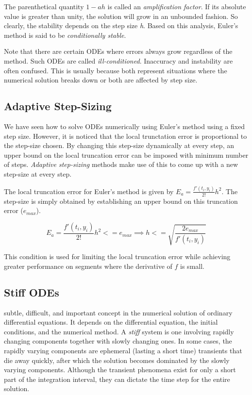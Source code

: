 \documentclass[book.tex]{subfiles}
\begin{document}
The parenthetical quantity $1-ah$ is called an \textit{amplification factor}. If its absolute value is greater than unity, the solution will grow in an unbounded fashion. So clearly, the stability depends on the step size \textit{h}. Based on this analysis,
Euler’s method is said to be \textit{conditionally stable}.

Note that there are certain ODEs where errors always grow regardless of the method.
Such ODEs are called \textit{ill-conditioned}. Inaccuracy and instability are often confused. This is usually because both represent situations where the numerical solution breaks down or both are affected by step size.

\subsection{Adaptive Step-Sizing}

We have seen how to solve ODEs numerically using Euler's method using
 a fixed step size. However, it is noticed that the local trunctation error is proportional to the step-size chosen. By changing this step-size dynamically at every step, an upper bound on the local truncation error can be imposed with minimum number of steps. \textit{Adaptive step-sizing} methods make use of this to come up with a new step-size at every step.

The local truncation error for Euler's method is given by $E_a = \frac{f'(t_i,y_i)}{2!}h^2$. The step-size is simply obtained by establishing an upper bound on this truncation error ($e_{max}$).

	\begin{equation*}
	E_a = \frac{f'(t_i,y_i)}{2!}h^2 <= e_{max} \implies h <= \sqrt{\dfrac{2e_{max}}{f'(t_i,y_i)}}
	\end{equation*}
	
This condition is used for limiting the local truncation error while achieving greater performance on segments where the derivative of $f$ is small. 

\subsection{Stiff ODEs}

subtle, difficult, and important concept in the numerical solution of ordinary differential equations. It depends on the differential equation, the initial conditions, and the numerical method. A \textit{stiff} system is one involving rapidly changing components together with slowly changing ones. In some cases, the rapidly varying components are ephemeral (lasting a short time) transients that die away quickly, after which the solution becomes dominated by the slowly varying components. Although the transient phenomena exist for only a short part of the integration interval, they can dictate the time step for the entire solution.
\end{document}
